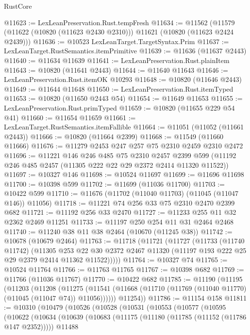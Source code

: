 \begin{lexlean}{RustCore}
\begin{coremodule}
@11623 := LexLeanPreservation.Rust.tempFresh
@11634 := @11562
    (@11579 (@11622 (@10820 (@11623 @2430 @2310))) @11621 (@10820 (@11623 @2424 @2439)))
@11636 := @10523 LexLeanTarget.TargetSyntax.Prim
@11637 := LexLeanTarget.RustSemantics.itemPrimitive
@11639 := @11636 (@11637 @2443)
@11640 := @11634 @11639
@11641 := LexLeanPreservation.Rust.plainItem
@11643 := @10820 (@11641 @2443)
@11644 := @11640 @11643
@11646 := LexLeanPreservation.Rust.itemOK @10293
@11648 := @10820 (@11646 @2443)
@11649 := @11644 @11648
@11650 := LexLeanPreservation.Rust.itemTyped
@11653 := @10820 (@11650 @2443 @54)
@11654 := @11649 @11653
@11655 := LexLeanPreservation.Rust.primTyped
@11659 := @10820 (@11655 @229 @54 @41)
@11660 := @11654 @11659
@11661 := LexLeanTarget.RustSemantics.itemFallible
@11664 := @11051 (@11052 (@11661 @2443))
@11666 := @10820 (@11664 @2399)
@11668 := @11549 (@11660 @11666)
@11676 := @11279 @2453 @247 @257 @75 @2310 @2459 @2310 @2472
@11696 := @11221
    @146
    @246
    @485
    @75
    @2310
    @2457
    @2399
    @599
    (@11192 @246 @485 @2457 (@11305 @222 @22 @29 @2372 @2414 @11320 @11522))
@11697 := @10327 @146
@11698 := @10524 @11697
@11699 := @11696 @11698
@11700 := @10398 @599
@11702 := @11699 (@11036 @11700)
@11703 := @10422 @599
@11710 := @11676 (@11702 (@11040 @11703) (@11045 (@11047 @146)) @11056)
@11718 := @11221 @74 @256 @33 @75 @2310 @2470 @2399 @682
@11721 := @11192 @256 @33 @2470
@11727 := @11233 @255 @11 @32 @2362 @2469 @11251
@11733 := @11197 @250 @254 @11 @31 @2464 @2468
@11740 := @11240 @38 @11 @38 @2464 (@10670 (@11245 @38))
@11742 := @10678 (@10679 @2464)
@11763 := @11718
    (@11721
      (@11727
        (@11733
          (@11740 @11742)
          (@11305
            @253
            @22
            @30
            @2372
            @2467
            @11320
            (@11197 @193 @222 @25 @29 @2379 @2414 @11362 @11522)))))
@11764 := @10327 @74
@11765 := @10524 @11764
@11766 := @11763 @11765
@11767 := @10398 @682
@11769 := @11766 (@11036 @11767)
@11770 := @10422 @682
@11785 := @11190
    (@11195
      (@11203
        (@11208
          (@11275 (@11541 (@11668 (@11710 (@11769 (@11040 @11770) (@11045 (@11047 @74)) @11056))))))
        @11254))
@11786 := @11154 @158
@11811 := @10310
    (@10479
      (@10526
        (@10528
          (@10531
            (@10553
              (@10577
                (@10595
                  (@10622
                    (@10634
                      (@10639
                        (@10683
                          (@11175 (@11180 (@11785 (@11152 (@11786 @147 @2352)))))
                          @11488

\end{coremodule}
\end{lexlean}
